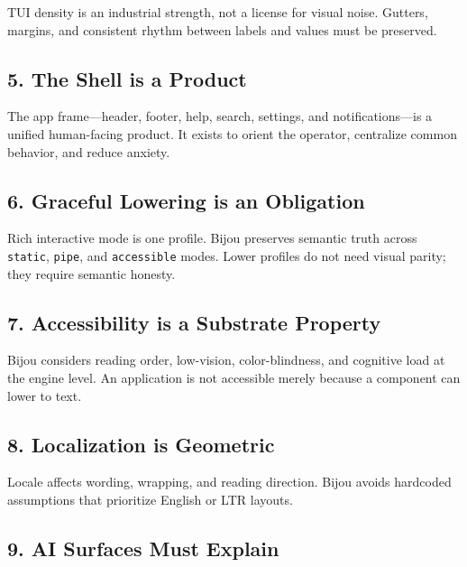 TUI density is an industrial strength, not a license for visual noise. Gutters, margins, and consistent rhythm between labels and values must be preserved.

\subsection{5. The Shell is a Product}\label{record-034-the-shell-is-a-product}

The app frame---header, footer, help, search, settings, and notifications---is a unified human-facing product. It exists to orient the operator, centralize common behavior, and reduce anxiety.

\subsection{6. Graceful Lowering is an Obligation}\label{record-034-graceful-lowering-is-an-obligation}

Rich interactive mode is one profile. Bijou preserves semantic truth across \texttt{s\allowbreak{}t\allowbreak{}a\allowbreak{}t\allowbreak{}i\allowbreak{}c}, \texttt{p\allowbreak{}i\allowbreak{}p\allowbreak{}e}, and \texttt{a\allowbreak{}c\allowbreak{}c\allowbreak{}e\allowbreak{}s\allowbreak{}s\allowbreak{}i\allowbreak{}b\allowbreak{}l\allowbreak{}e} modes. Lower profiles do not need visual parity; they require semantic honesty.

\subsection{7. Accessibility is a Substrate Property}\label{record-034-accessibility-is-a-substrate-property}

Bijou considers reading order, low-vision, color-blindness, and cognitive load at the engine level. An application is not accessible merely because a component can lower to text.

\subsection{8. Localization is Geometric}\label{record-034-localization-is-geometric}

Locale affects wording, wrapping, and reading direction. Bijou avoids hardcoded assumptions that prioritize English or LTR layouts.

\subsection{9. AI Surfaces Must Explain}\label{record-034-ai-surfaces-must-explain}

